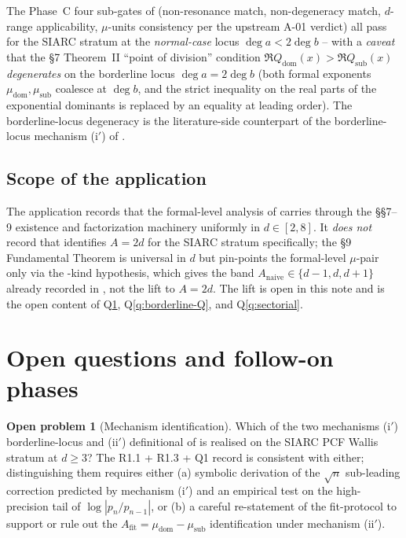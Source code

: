 \documentclass[11pt,reqno]{amsart}
\theoremstyle{plain}
\theoremstyle{definition}
\newtheorem{problem}[theorem]{Open problem}
\theoremstyle{remark}
\newcommand{\Anaive}{A_{\mathrm{naive}}}
\newcommand{\Afit}{A_{\mathrm{fit}}}
\newcommand{\dega}{\deg a}
\newcommand{\degb}{\deg b}
\begin{document}
The Phase~C four sub-gates of \cite[Phase~C.2]{siarc_t1_phase2}
(non-resonance match, non-degeneracy match, $d$-range
applicability, $\mu$-units consistency per the upstream A-01
verdict) all pass for the SIARC stratum at the
\emph{normal-case} locus $\dega < 2\degb$ -- with a
\emph{caveat} that the \S7 Theorem~II ``point of division''
condition $\Re Q_{\mathrm{dom}}(x) > \Re Q_{\mathrm{sub}}(x)$
\emph{degenerates} on the borderline locus $\dega = 2\degb$
(both formal exponents $\mu_{\mathrm{dom}}, \mu_{\mathrm{sub}}$
coalesce at $\degb$, and the strict inequality on the real
parts of the exponential dominants is replaced by an equality
at leading order). The borderline-locus degeneracy is the
literature-side counterpart of the borderline-locus mechanism
\textup{(i$'$)} of .

\subsection{Scope of the application}
The application records that the formal-level analysis of
 carries through the
\cite{birkhoff_trjitzinsky_1933} \S\S7--9 existence and
factorization machinery uniformly in $d \in [2, 8]$. It
\emph{does not} record that \cite{birkhoff_trjitzinsky_1933}
identifies $A = 2d$ for the SIARC stratum specifically; the
\S9 Fundamental Theorem is universal in $d$ but pin-points
the formal-level $\mu$-pair only via the
\cite[\S1]{birkhoff_trjitzinsky_1933}-kind hypothesis,
which gives the band $\Anaive \in \{d-1, d, d+1\}$ already
recorded in , not the lift to
$A = 2d$. The lift is open in this note and is the open
content of  Q\ref{q:mechanism},
Q\ref{q:borderline-Q}, and Q\ref{q:sectorial}.

\section{Open questions and follow-on phases}
\label{sec:open}

\begin{problem}[Mechanism identification]
\label{q:mechanism}
Which of the two mechanisms (i$'$) borderline-locus and
(ii$'$) definitional of  is realised
on the SIARC PCF Wallis stratum at $d \ge 3$? The
\cite{papanokechi_pcf2_v13} R1.1 + R1.3 + Q1 record is
consistent with either; distinguishing them requires
either (a) symbolic derivation of the $\sqrt{n}$ sub-leading
correction predicted by mechanism (i$'$) and an empirical
test on the high-precision tail of $\log|p_n / p_{n-1}|$, or
(b) a careful re-statement of the \cite{papanokechi_pcf2_v13}
fit-protocol to support or rule out the
$\Afit = \mu_{\mathrm{dom}} - \mu_{\mathrm{sub}}$ identification
under mechanism (ii$'$).
\end{problem}
\end{document}
